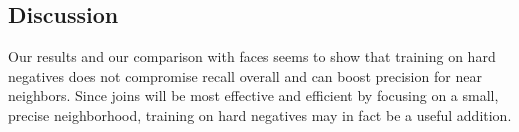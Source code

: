 \subsection{Discussion}

 Our results and our comparison with faces seems to show that training on hard negatives does not compromise recall overall and can boost precision for near neighbors.  Since joins will be most effective and efficient by focusing on a small, precise neighborhood, training on hard negatives may in fact be a useful addition.
